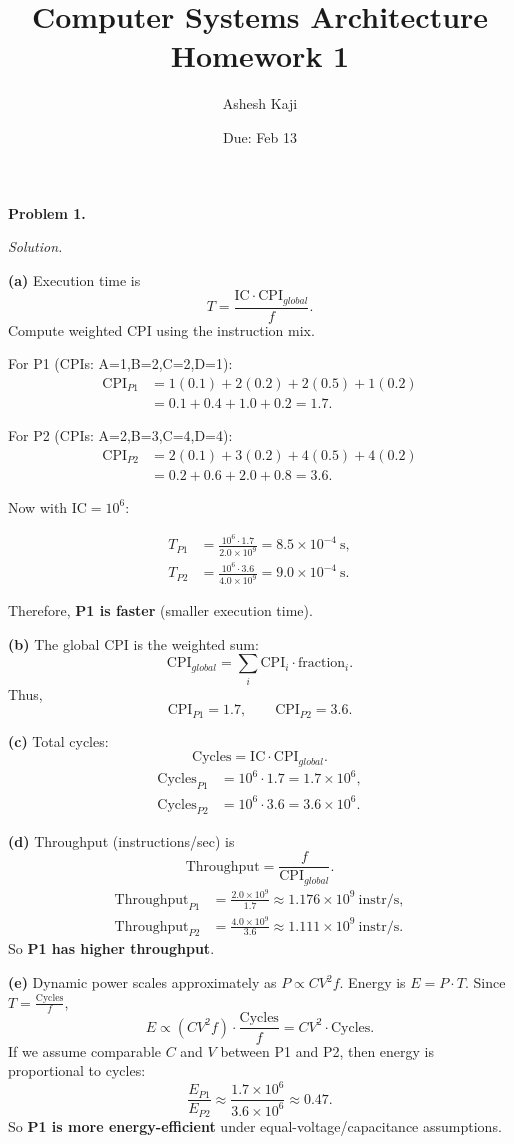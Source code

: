 \documentclass[12pt]{article}
\title{Computer Systems Architecture\\Homework 1}
\author{Ashesh Kaji}
\date{Due: Feb 13}
\newcommand{\problem}[1]{\vspace{0.5em}\noindent\textbf{Problem #1.}\vspace{0.3em}}
\newenvironment{solution}{\par\noindent\textit{Solution.}}{\par\vspace{1em}}
\newcommand{\subproblem}[1]{\par\noindent\textbf{(#1)}\quad}
\begin{document}
\maketitle

\problem{1}
\begin{solution}

\subproblem{a}
Execution time is
\[
T=\frac{\text{IC}\cdot \text{CPI}_{global}}{f}.
\]
Compute weighted CPI using the instruction mix.

For P1 (CPIs: A=1,B=2,C=2,D=1):
\begin{align}
\text{CPI}_{P1} &= 1(0.1)+2(0.2)+2(0.5)+1(0.2) \\
&=0.1+0.4+1.0+0.2=1.7.
\end{align}

For P2 (CPIs: A=2,B=3,C=4,D=4):
\begin{align}
\text{CPI}_{P2} &= 2(0.1)+3(0.2)+4(0.5)+4(0.2) \\
&=0.2+0.6+2.0+0.8=3.6.
\end{align}

Now with $\text{IC}=10^6$:

\begin{align}
T_{P1} &= \frac{10^6 \cdot 1.7}{2.0\times 10^9}
= 8.5\times 10^{-4}\ \text{s},\\
T_{P2} &= \frac{10^6 \cdot 3.6}{4.0\times 10^9}
= 9.0\times 10^{-4}\ \text{s}.
\end{align}

Therefore, \textbf{P1 is faster} (smaller execution time).

\subproblem{b}
The global CPI is the weighted sum:
\[
\text{CPI}_{global}=\sum_i \text{CPI}_i\cdot \text{fraction}_i.
\]
Thus,
\[
\text{CPI}_{P1}=1.7,\qquad \text{CPI}_{P2}=3.6.
\]

\subproblem{c}
Total cycles:
\[
\text{Cycles}=\text{IC}\cdot \text{CPI}_{global}.
\]
\begin{align}
\text{Cycles}_{P1} &= 10^6 \cdot 1.7 = 1.7\times 10^6,\\
\text{Cycles}_{P2} &= 10^6 \cdot 3.6 = 3.6\times 10^6.
\end{align}

\subproblem{d}
Throughput (instructions/sec) is
\[
\text{Throughput}=\frac{f}{\text{CPI}_{global}}.
\]
\begin{align}
\text{Throughput}_{P1} &= \frac{2.0\times 10^9}{1.7}\approx 1.176\times 10^9\ \text{instr/s},\\
\text{Throughput}_{P2} &= \frac{4.0\times 10^9}{3.6}\approx 1.111\times 10^9\ \text{instr/s}.
\end{align}
So \textbf{P1 has higher throughput}.

\subproblem{e}
Dynamic power scales approximately as $P\propto C V^2 f$.
Energy is $E=P\cdot T$. Since $T=\frac{\text{Cycles}}{f}$,
\[
E \propto (C V^2 f)\cdot \frac{\text{Cycles}}{f}= C V^2\cdot \text{Cycles}.
\]
If we assume comparable $C$ and $V$ between P1 and P2, then energy is proportional to cycles:
\[
\frac{E_{P1}}{E_{P2}}\approx \frac{1.7\times 10^6}{3.6\times 10^6}\approx 0.47.
\]
So \textbf{P1 is more energy-efficient} under equal-voltage/capacitance assumptions.

\end{solution}
\end{document}
